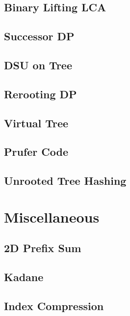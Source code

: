 \documentclass[10pt,letterpaper,landscape,twocolumn]{article}
\begin{document}
\subsection{Binary Lifting LCA}

\subsection{Successor DP}

\subsection{DSU on Tree}

\subsection{Rerooting DP}

\subsection{Virtual Tree}

\subsection{Prufer Code}

\subsection{Unrooted Tree Hashing}


\section{Miscellaneous}
\subsection{2D Prefix Sum}

\subsection{Kadane}

\subsection{Index Compression}

\end{document}
